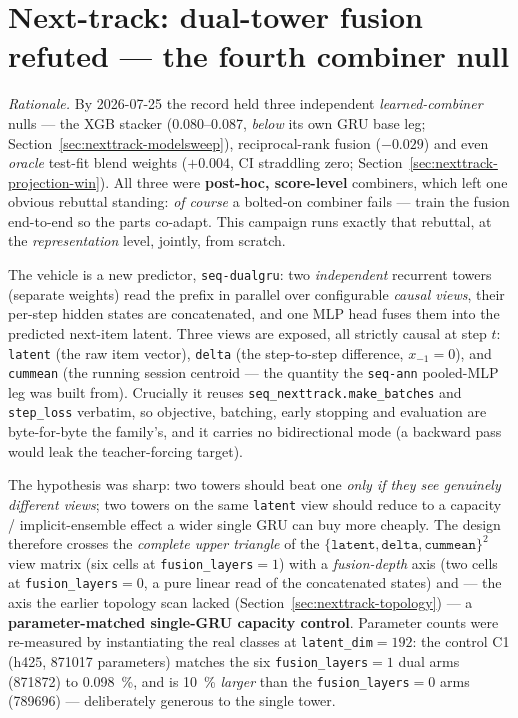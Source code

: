 \documentclass[11pt]{article}
\begin{document}
\section{Next-track: dual-tower fusion refuted --- the fourth combiner null}
\label{sec:nexttrack-dualtower}
\emph{Rationale.} By 2026-07-25 the record held three independent
\emph{learned-combiner} nulls --- the XGB stacker (\numrange{0.080}{0.087},
\emph{below} its own GRU base leg; Section~\ref{sec:nexttrack-modelsweep}), reciprocal-rank
fusion ($-\num{0.029}$) and even \emph{oracle} test-fit blend weights
($+\num{0.004}$, CI straddling zero; Section~\ref{sec:nexttrack-projection-win}). All three
were \textbf{post-hoc, score-level} combiners, which left one obvious rebuttal
standing: \emph{of course} a bolted-on combiner fails --- train the fusion
end-to-end so the parts co-adapt. This campaign runs exactly that rebuttal, at
the \emph{representation} level, jointly, from scratch.

The vehicle is a new predictor, \texttt{seq-dualgru}: two \emph{independent}
recurrent towers (separate weights) read the prefix in parallel over
configurable \emph{causal views}, their per-step hidden states are concatenated,
and one MLP head fuses them into the predicted next-item latent. Three views are
exposed, all strictly causal at step $t$: \texttt{latent} (the raw item vector),
\texttt{delta} (the step-to-step difference, $x_{-1}=0$), and \texttt{cummean}
(the running session centroid --- the quantity the \texttt{seq-ann} pooled-MLP
leg was built from). Crucially it reuses \texttt{seq\_nexttrack.make\_batches}
and \texttt{step\_loss} verbatim, so objective, batching, early stopping and
evaluation are byte-for-byte the family's, and it carries no bidirectional mode
(a backward pass would leak the teacher-forcing target).

The hypothesis was sharp: two towers should beat one \emph{only if they see
genuinely different views}; two towers on the same \texttt{latent} view should
reduce to a capacity / implicit-ensemble effect a wider single GRU can buy more
cheaply. The design therefore crosses the \emph{complete upper triangle} of the
$\{\texttt{latent},\texttt{delta},\texttt{cummean}\}^2$ view matrix (six cells at
\texttt{fusion\_layers}${}=1$) with a \emph{fusion-depth} axis (two cells at
\texttt{fusion\_layers}${}=0$, a pure linear read of the concatenated states) and
--- the axis the earlier topology scan lacked (Section~\ref{sec:nexttrack-topology}) --- a
\textbf{parameter-matched single-GRU capacity control}. Parameter counts were
re-measured by instantiating the real classes at \texttt{latent\_dim}${}=192$:
the control C1 (h425, \num{871017} parameters) matches the six
\texttt{fusion\_layers}${}=1$ dual arms (\num{871872}) to
\SI{0.098}{\percent}, and is \SI{10}{\percent} \emph{larger} than the
\texttt{fusion\_layers}${}=0$ arms (\num{789696}) --- deliberately generous to
the single tower.
\end{document}
